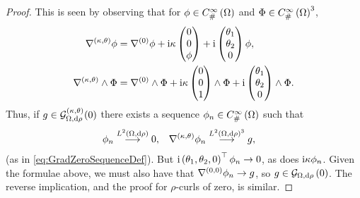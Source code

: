 \begin{proof}
	This is seen by observing that for $\phi\in C^{\infty}_{\#}\left( \Omega \right)$ and $\Phi\in C^{\infty}_{\#}\left( \Omega \right)^3$,
	\begin{align*}
		\nabla^{\left( \kappa, \theta \right)}\phi &= \nabla^{(0)}\phi + \mathrm{i}\kappa\begin{pmatrix} 0 \\ 0 \\ \phi \end{pmatrix} + \mathrm{i}\begin{pmatrix} \theta_1 \\ \theta_2 \\ 0 \end{pmatrix}\phi, \\
		\nabla^{\left( \kappa, \theta \right)}\wedge\Phi &= \nabla^{(0)}\wedge\Phi + \mathrm{i}\kappa\begin{pmatrix} 0 \\ 0 \\ 1 \end{pmatrix}\wedge\Phi + \mathrm{i}\begin{pmatrix} \theta_1 \\ \theta_2 \\ 0 \end{pmatrix} \wedge \Phi.
	\end{align*}
	Thus, if $g\in \mathcal{G}_{\Omega,\mathrm{d}\rho}^{\left( \kappa, \theta \right)}(0)$ there exists a sequence $\phi_n\in C^{\infty}_{\#}\left( \Omega \right)$ such that
	\begin{align*}
		\phi_n \overset{L^{2}\left( \Omega,\mathrm{d} \rho \right)}{\longrightarrow} 0, &\quad \nabla^{\left( \kappa, \theta \right)}\phi_n \overset{ L^{2}\left( \Omega,\mathrm{d} \rho \right)^3 }{\longrightarrow} g,
	\end{align*}
	(as in \eqref{eq:GradZeroSequenceDef}).
	But $\mathrm{i}\left( \theta_1, \theta_2, 0 \right)^{\top}\phi_n\rightarrow 0$, as does $\mathrm{i}\kappa\phi_n$.
	Given the formulae above, we must also have that $\nabla^{\left( 0, 0 \right)}\phi_n\rightarrow g$, so $g\in \mathcal{G}_{ \Omega, \mathrm{d}\rho}\left( 0 \right)$.
	The reverse implication, and the proof for $\rho$-curls of zero, is similar.
\end{proof}

